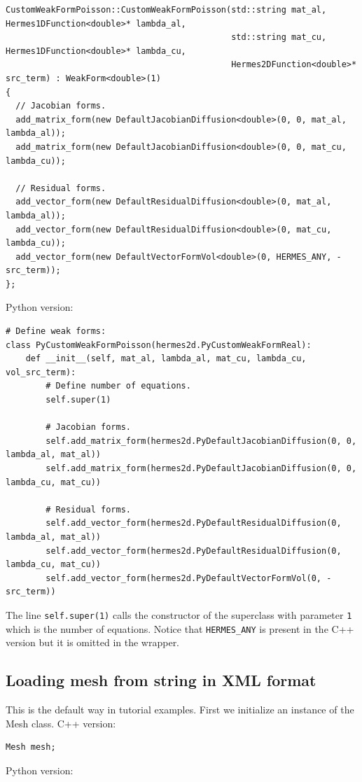 \documentclass{article}
\begin{document}
{\small
\begin{verbatim}
CustomWeakFormPoisson::CustomWeakFormPoisson(std::string mat_al, Hermes1DFunction<double>* lambda_al,
                                             std::string mat_cu, Hermes1DFunction<double>* lambda_cu,
                                             Hermes2DFunction<double>* src_term) : WeakForm<double>(1)
{
  // Jacobian forms.
  add_matrix_form(new DefaultJacobianDiffusion<double>(0, 0, mat_al, lambda_al));
  add_matrix_form(new DefaultJacobianDiffusion<double>(0, 0, mat_cu, lambda_cu));

  // Residual forms.
  add_vector_form(new DefaultResidualDiffusion<double>(0, mat_al, lambda_al));
  add_vector_form(new DefaultResidualDiffusion<double>(0, mat_cu, lambda_cu));
  add_vector_form(new DefaultVectorFormVol<double>(0, HERMES_ANY, -src_term));
};

\end{verbatim}
}
\noindent
Python version:
{\small
\begin{verbatim}
# Define weak forms:
class PyCustomWeakFormPoisson(hermes2d.PyCustomWeakFormReal):
    def __init__(self, mat_al, lambda_al, mat_cu, lambda_cu, vol_src_term):
        # Define number of equations.
        self.super(1)

        # Jacobian forms.
        self.add_matrix_form(hermes2d.PyDefaultJacobianDiffusion(0, 0, lambda_al, mat_al))
        self.add_matrix_form(hermes2d.PyDefaultJacobianDiffusion(0, 0, lambda_cu, mat_cu))

        # Residual forms.
        self.add_vector_form(hermes2d.PyDefaultResidualDiffusion(0, lambda_al, mat_al))
        self.add_vector_form(hermes2d.PyDefaultResidualDiffusion(0, lambda_cu, mat_cu))
        self.add_vector_form(hermes2d.PyDefaultVectorFormVol(0, -src_term))
\end{verbatim}
}
\noindent
The line {\tt self.super(1)} calls the constructor of the superclass with parameter 
{\tt 1} which is the number of equations. Notice that {\tt HERMES\_ANY} is present 
in the C++ version but it is omitted in the wrapper. 

\subsection*{Loading mesh from string in XML format}

This is the default way in tutorial examples. First we initialize 
an instance of the Mesh class. C++ version:

{\small
\begin{verbatim}
Mesh mesh;
\end{verbatim}
}
\noindent
Python version:
\end{document}
